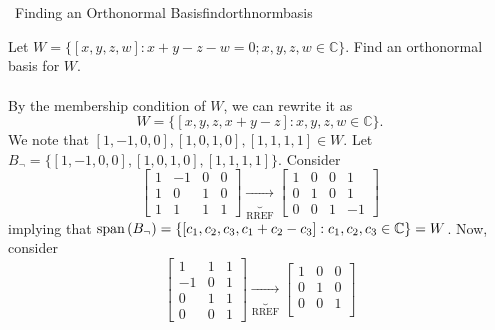         \pagebreak
        \vphantom
        \\
        \\
        \begin{example}{\Difficulty\,\Difficulty\,\,Finding an Orthonormal Basis}{findorthnormbasis}

            Let \(W=\{[x,y,z,w]:x+y-z-w=0;x,y,z,w\in\mathbb{C}\}\). Find an orthonormal basis for \(W\).
            \\
            \\
            By the membership condition of \(W\), we can rewrite it as
            \begin{equation*}
                W=\{[x,y,z,x+y-z]:x,y,z,w\in\mathbb{C}\}.
            \end{equation*}
            We note that \([1,-1,0,0],[1,0,1,0],[1,1,1,1]\in W\). Let \(B_\neg=\{[1,-1,0,0],[1,0,1,0],[1,1,1,1]\}\). Consider
            \begin{equation*}
                \begin{bmatrix}
                    1 & -1 & 0 & 0 \\
                    1 & 0 & 1 & 0 \\
                    1 & 1 & 1 & 1
                \end{bmatrix}\underbrace{\to}_\text{RREF}
                \begin{bmatrix}
                    1 & 0 & 0 & 1 \\
                    0 & 1 & 0 & 1 \\
                    0 & 0 & 1 & -1
                \end{bmatrix}
            \end{equation*}
            implying that \(\text{span\,}(B_\neg)=\{[c_1,c_2,c_3,c_1+c_2-c_3]:c_1,c_2,c_3\in\mathbb{C}\}=W\). Now, consider
            \begin{equation*}
                \begin{bmatrix}
                    1 & 1 & 1 \\
                    -1 & 0 & 1 \\
                    0 & 1 & 1 \\
                    0 & 0 & 1
                \end{bmatrix}\underbrace{\to}_\text{RREF}
                \begin{bmatrix}
                    1 & 0 & 0 \\
                    0 & 1 & 0 \\
                    0 & 0 & 1 \\

\end{bmatrix}
\end{equation*}
\end{example}
